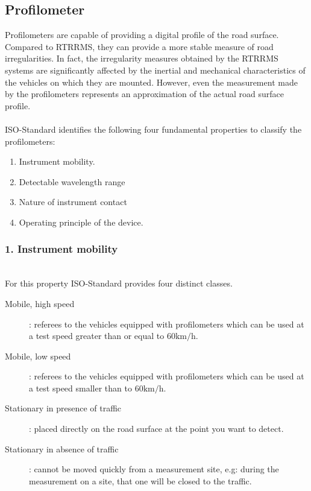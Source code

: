 \documentclass{standalone}
\begin{document}
		\subsection{Profilometer}\label{profilometers}
\noindent Profilometers are capable of providing a digital profile of the road surface. Compared to RTRRMS, they can provide a more stable measure of road irregularities. In fact, the irregularity measures obtained by the RTRRMS systems are significantly affected by the inertial and mechanical characteristics of the vehicles on which they are mounted. However, even the measurement made by the profilometers represents an approximation of the actual road surface profile.\cite{sayers1996interpretation}\\\\
ISO-Standard\cite{iso_standard} identifies the following four fundamental properties to classify the profilometers:
\begin{enumerate}
\item Instrument mobility.
\item Detectable wavelength range
\item Nature of instrument contact
\item Operating principle of the device.
\end{enumerate}
\clearpage
\noindent

\subsubsection{1. Instrument mobility}\leavevmode\\
For this property ISO-Standard \cite{iso_standard} provides four distinct classes.
\begin{description}
\item [Mobile, high speed]: referees to the vehicles equipped with profilometers which can be used at a test speed greater than or equal to $\num{60} \si{\km\per\hour}$.
\item [Mobile, low speed]: referees to the vehicles equipped with profilometers which can be used at a test speed smaller than to $\num{60} \si{\km\per\hour}$.
\item [Stationary in presence of traffic]: placed directly on the road surface at the point you want to detect.
\item [Stationary in absence of traffic]: cannot be moved quickly from a measurement site, e.g: during the measurement on a site, that one will be closed to the traffic.
\end{description}
\end{document}
